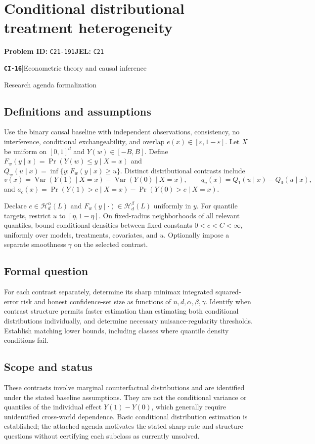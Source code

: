 \documentclass[11pt,a4paper]{article}
\newcommand{\entrymeta}[3]{{\sffamily\small\color{muted}\textbf{\texttt{#1}}\quad|\quad #2\par #3\par}}
\begin{document}
\section*{Conditional distributional treatment heterogeneity}
\textbf{Problem ID:} \texttt{C21-191}\quad \textbf{JEL:} \texttt{C21}\par
\label{problem:OP-0495}
\label{beyond:CI-16}
\entrymeta{CI-16}{Econometric theory and causal inference}{Research agenda formalization}
\subsection*{Definitions and assumptions}
Use the binary causal baseline with independent observations, consistency, no interference, conditional exchangeability, and overlap $e(x)\in[\varepsilon,1-\varepsilon]$. Let $X$ be uniform on $[0,1]^d$ and $Y(w)\in[-B,B]$. Define $F_w(y\mid x)=\Pr(Y(w)\leq y\mid X=x)$ and $Q_w(u\mid x)=\inf\{y:F_w(y\mid x)\geq u\}$. Distinct distributional contrasts include
\[
v(x)=\operatorname{Var}(Y(1)\mid X=x)-
      \operatorname{Var}(Y(0)\mid X=x),\qquad
q_u(x)=Q_1(u\mid x)-Q_0(u\mid x),
\]
and $a_c(x)=\Pr(Y(1)>c\mid X=x)-\Pr(Y(0)>c\mid X=x)$.

Declare $e\in\mathcal H_d^\alpha(L)$ and $F_w(y\mid\cdot)\in\mathcal H_d^\beta(L)$ uniformly in $y$. For quantile targets, restrict $u$ to $[\eta,1-\eta]$. On fixed-radius neighborhoods of all relevant quantiles, bound conditional densities between fixed constants $0<c<C<\infty$, uniformly over models, treatments, covariates, and $u$. Optionally impose a separate smoothness $\gamma$ on the selected contrast.
\subsection*{Formal question}
For each contrast separately, determine its sharp minimax integrated squared-error risk and honest confidence-set size as functions of $n,d,\alpha,\beta,\gamma$. Identify when contrast structure permits faster estimation than estimating both conditional distributions individually, and determine necessary nuisance-regularity thresholds. Establish matching lower bounds, including classes where quantile density conditions fail.
\subsection*{Scope and status}
These contrasts involve marginal counterfactual distributions and are identified under the stated baseline assumptions. They are not the conditional variance or quantiles of the individual effect $Y(1)-Y(0)$, which generally require unidentified cross-world dependence. Basic conditional distribution estimation is established; the attached agenda motivates the stated sharp-rate and structure questions without certifying each subclass as currently unsolved.
\end{document}
